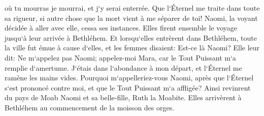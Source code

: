\verse où tu mourras je mourrai, et j`y serai enterrée. Que l`Éternel me traite dans toute sa rigueur, si autre chose que la mort vient à me séparer de toi! 
\verse Naomi, la voyant décidée à aller avec elle, cessa ses instances. 
\verse Elles firent ensemble le voyage jusqu`à leur arrivée à Bethléhem. Et lorsqu`elles entrèrent dans Bethléhem, toute la ville fut émue à cause d`elles, et les femmes disaient: Est-ce là Naomi? 
\verse Elle leur dit: Ne m`appelez pas Naomi; appelez-moi Mara, car le Tout Puissant m`a remplie d`amertume. 
\verse J`étais dans l`abondance à mon départ, et l`Éternel me ramène les mains vides. Pourquoi m`appelleriez-vous Naomi, après que l`Éternel s`est prononcé contre moi, et que le Tout Puissant m`a affligée? 
\verse Ainsi revinrent du pays de Moab Naomi et sa belle-fille, Ruth la Moabite. Elles arrivèrent à Bethléhem au commencement de la moisson des orges. 

\chapter{}

